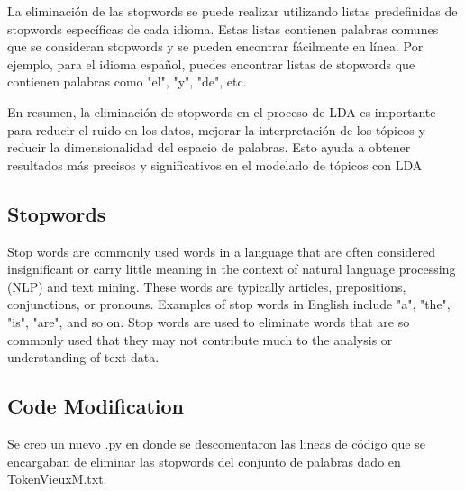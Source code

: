 \documentclass[10pt]{article} %
\begin{document}
	La eliminación de las stopwords se puede realizar utilizando listas predefinidas de stopwords específicas de cada idioma. Estas listas contienen palabras comunes que se consideran stopwords y se pueden encontrar fácilmente en línea. Por ejemplo, para el idioma español, puedes encontrar listas de stopwords que contienen palabras como "el", "y", "de", etc.
	
	En resumen, la eliminación de stopwords en el proceso de LDA es importante para reducir el ruido en los datos, mejorar la interpretación de los tópicos y reducir la dimensionalidad del espacio de palabras. Esto ayuda a obtener resultados más precisos y significativos en el modelado de tópicos con LDA
	
	\subsection{Stopwords}
	
	Stop words are commonly used words in a language that are often considered insignificant or carry little meaning in the context of natural language processing (NLP) and text mining. These words are typically articles, prepositions, conjunctions, or pronouns. Examples of stop words in English include "a", "the", "is", "are", and so on. Stop words are used to eliminate words that are so commonly used that they may not contribute much to the analysis or understanding of text data.
	
	\subsection{Code Modification}
	
	Se creo un nuevo .py en donde se descomentaron las lineas de c\'odigo que se encargaban de eliminar las stopwords del conjunto de palabras dado en TokenVieuxM.txt.
	
\end{document}
